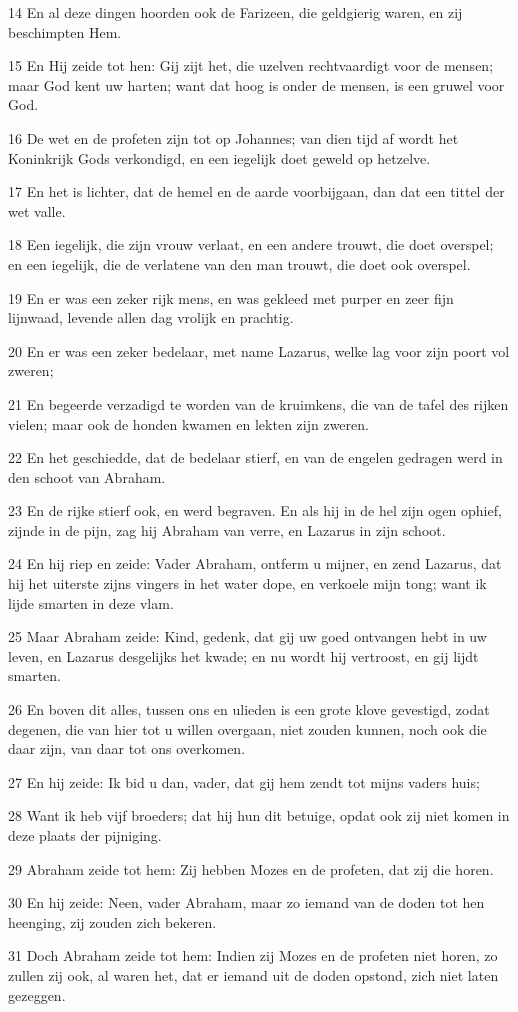 \par 14 En al deze dingen hoorden ook de Farizeen, die geldgierig waren, en zij beschimpten Hem.
\par 15 En Hij zeide tot hen: Gij zijt het, die uzelven rechtvaardigt voor de mensen; maar God kent uw harten; want dat hoog is onder de mensen, is een gruwel voor God.
\par 16 De wet en de profeten zijn tot op Johannes; van dien tijd af wordt het Koninkrijk Gods verkondigd, en een iegelijk doet geweld op hetzelve.
\par 17 En het is lichter, dat de hemel en de aarde voorbijgaan, dan dat een tittel der wet valle.
\par 18 Een iegelijk, die zijn vrouw verlaat, en een andere trouwt, die doet overspel; en een iegelijk, die de verlatene van den man trouwt, die doet ook overspel.
\par 19 En er was een zeker rijk mens, en was gekleed met purper en zeer fijn lijnwaad, levende allen dag vrolijk en prachtig.
\par 20 En er was een zeker bedelaar, met name Lazarus, welke lag voor zijn poort vol zweren;
\par 21 En begeerde verzadigd te worden van de kruimkens, die van de tafel des rijken vielen; maar ook de honden kwamen en lekten zijn zweren.
\par 22 En het geschiedde, dat de bedelaar stierf, en van de engelen gedragen werd in den schoot van Abraham.
\par 23 En de rijke stierf ook, en werd begraven. En als hij in de hel zijn ogen ophief, zijnde in de pijn, zag hij Abraham van verre, en Lazarus in zijn schoot.
\par 24 En hij riep en zeide: Vader Abraham, ontferm u mijner, en zend Lazarus, dat hij het uiterste zijns vingers in het water dope, en verkoele mijn tong; want ik lijde smarten in deze vlam.
\par 25 Maar Abraham zeide: Kind, gedenk, dat gij uw goed ontvangen hebt in uw leven, en Lazarus desgelijks het kwade; en nu wordt hij vertroost, en gij lijdt smarten.
\par 26 En boven dit alles, tussen ons en ulieden is een grote klove gevestigd, zodat degenen, die van hier tot u willen overgaan, niet zouden kunnen, noch ook die daar zijn, van daar tot ons overkomen.
\par 27 En hij zeide: Ik bid u dan, vader, dat gij hem zendt tot mijns vaders huis;
\par 28 Want ik heb vijf broeders; dat hij hun dit betuige, opdat ook zij niet komen in deze plaats der pijniging.
\par 29 Abraham zeide tot hem: Zij hebben Mozes en de profeten, dat zij die horen.
\par 30 En hij zeide: Neen, vader Abraham, maar zo iemand van de doden tot hen heenging, zij zouden zich bekeren.
\par 31 Doch Abraham zeide tot hem: Indien zij Mozes en de profeten niet horen, zo zullen zij ook, al waren het, dat er iemand uit de doden opstond, zich niet laten gezeggen.

